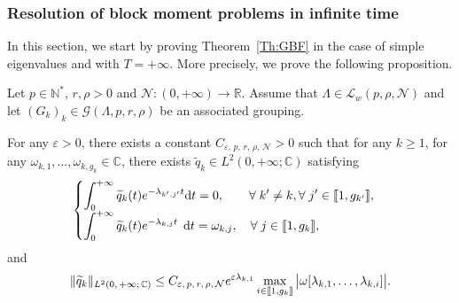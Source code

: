 \documentclass[AHL,Unicode,longabstracts]{cedram}
\newcommand{\llbracket}{\mathopen{[\mkern -2.7mu[}}
\newcommand{\rrbracket}{\mathclose{]\mkern -2.7mu]}}
\newcommand{\inter}[2]{\llbracket #1,#2 \rrbracket}
\newcommand{\n}{g}
\newcommand{\LL}{\mathcal{L}}
\newcommand{\NN}{\mathcal{N}}
\newcommand{\N}{\mathbb{N}}
\newcommand{\R}{\mathbb{R}}
\newcommand{\C}{\mathbb{C}}
\newcommand{\md}{\mathrm{d}}
\let\oldforall\forall
\renewcommand*{\forall}{\mathrel{\oldforall}}
\begin{document}
\subsubsection{Resolution of block moment problems in infinite time} \label{sec:BBM_infinite}

In this section, we start by proving Theorem~\ref{Th:GBF} in the case of simple eigenvalues and with $T=+\infty$. More precisely, we prove the following proposition.

\begin{prop}\label{Prop:GBF_Infini}
Let $p \in \N^*$, $r, \rho > 0$ and $\NN : (0,+\infty) \to \R$. Assume that $\Lambda \in \LL_w(p,\rho, \NN)$ and let $(G_k)_k\in \mathcal{G}(\Lambda,p,r,\rho)$ be an associated grouping.

For any $\varepsilon > 0$, there exists a constant $C_{\varepsilon,\,p,\,r,\,\rho,\,\NN} >0$ such that for any $k \geq 1$, for any $\omega_{k,1}, \dots, \omega_{k, \n_k} \in \C$, there exists $\widetilde{q}_k \in L^2(0,+\infty; \C)$ satisfying
\begin{equation}\label{GBF_Infini_quelconque}
\begin{cases}
\displaystyle\int_0^{+\infty} \widetilde{q}_k(t) e^{-\lambda_{k',j'} t } \md t = 0, \mkern36mu \forall k' \neq k, \forall j' \in \inter{1}{\n_{k'}},
\\[0.15em]
\displaystyle\int_0^{+\infty} \widetilde{q}_k(t) e^{-\lambda_{k,j} t } \;\,\md t = \omega_{k,j}, \quad \forall j \in \inter{1}{\n_k},
\end{cases}
\end{equation}
and
\begin{equation*}\label{Estimee_GBF_Infini}
\| \widetilde{q}_k \|_{L^2(0,\,+\infty ;\,\C)} \leq C_{\varepsilon,\,p,\,r,\,\rho,\,\NN} e^{\varepsilon \lambda_{k,1}} \max \limits_{i\in \inter{1}{\n_k}} \big| \omega[\lambda_{k,1}, \dots, \lambda_{k,i}] \big|.
\end{equation*}
\end{prop}
\end{document}
